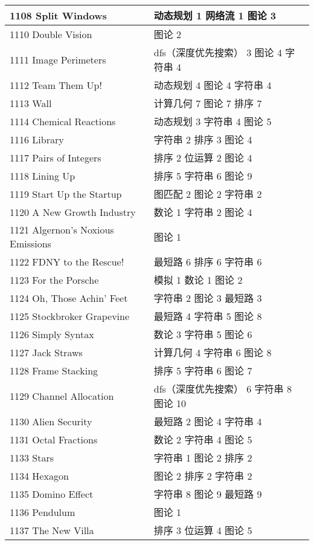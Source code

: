 \begin{longtable}{| p{} | p{} |}
 1108 Split Windows  & 动态规划 1 网络流 1 图论 3 \\ \hline
 1110 Double Vision  & 图论 2 \\ \hline
 1111 Image Perimeters  & dfs（深度优先搜索） 3 图论 4 字符串 4 \\ \hline
 1112 Team Them Up!  & 动态规划 4 图论 4 字符串 4 \\ \hline
 1113 Wall  & 计算几何 7 图论 7 排序 7 \\ \hline
 1114 Chemical Reactions  & 动态规划 3 字符串 4 图论 5 \\ \hline
 1116 Library  & 字符串 2 排序 3 图论 4 \\ \hline
 1117 Pairs of Integers  & 排序 2 位运算 2 图论 4 \\ \hline
 1118 Lining Up  & 排序 5 字符串 6 图论 9 \\ \hline
 1119 Start Up the Startup  & 图匹配 2 图论 2 字符串 2 \\ \hline
 1120 A New Growth Industry  & 数论 1 字符串 2 图论 4 \\ \hline
 1121 Algernon's Noxious Emissions  & 图论 1 \\ \hline
 1122 FDNY to the Rescue!  & 最短路 6 排序 6 字符串 6 \\ \hline
 1123 For the Porsche  & 模拟 1 数论 1 图论 2 \\ \hline
 1124 Oh, Those Achin' Feet  & 字符串 2 图论 3 最短路 3 \\ \hline
 1125 Stockbroker Grapevine  & 最短路 4 字符串 5 图论 8 \\ \hline
 1126 Simply Syntax  & 数论 3 字符串 5 图论 6 \\ \hline
 1127 Jack Straws  & 计算几何 4 字符串 6 图论 8 \\ \hline
 1128 Frame Stacking  & 排序 5 字符串 6 图论 7 \\ \hline
 1129 Channel Allocation  & dfs（深度优先搜索） 6 字符串 8 图论 10 \\ \hline
 1130 Alien Security  & 最短路 2 图论 4 字符串 4 \\ \hline
 1131 Octal Fractions  & 数论 2 字符串 4 图论 5 \\ \hline
 1133 Stars  & 字符串 1 图论 2 排序 2 \\ \hline
 1134 Hexagon  & 图论 2 排序 2 字符串 2 \\ \hline
 1135 Domino Effect  & 字符串 8 图论 9 最短路 9 \\ \hline
 1136 Pendulum  & 图论 1 \\ \hline
 1137 The New Villa  & 排序 3 位运算 4 图论 5 \\ \hline

\end{longtable}
